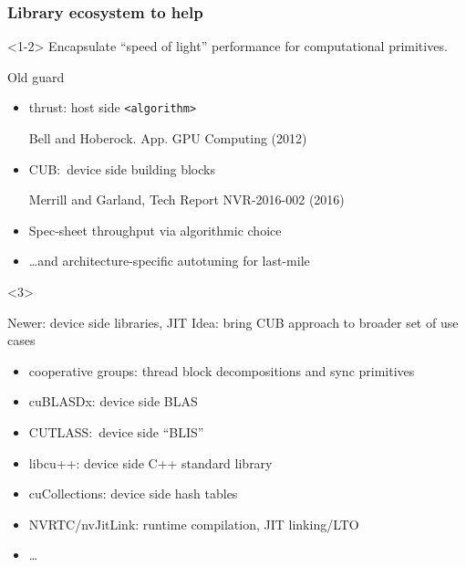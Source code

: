 \documentclass[aspectratio=169]{beamer}
\begin{document}
\begin{frame}[fragile]
  \frametitle{Library ecosystem to help}
  \begin{onlyenv}<1-2>
    Encapsulate ``speed of light'' performance for computational
    primitives. 
    \pause

    \begin{block}{Old guard}
      \begin{itemize}
      \item thrust: host side \verb~<algorithm>~

        {\scriptsize
          \raggedleft
          Bell and Hoberock. App. GPU Computing (2012) \nocite{Bell:2012}
          \par
        }
      \item CUB:~device side building blocks

        {\scriptsize
          \raggedleft
          Merrill and Garland, Tech Report NVR-2016-002 (2016) \nocite{Merrill:2016}
          \par
        }
      \item Spec-sheet throughput via algorithmic choice
      \item \dots and architecture-specific autotuning for last-mile
      \end{itemize}
    \end{block}
  \end{onlyenv}
  
  \begin{onlyenv}<3>
    \begin{block}{Newer: device side libraries, JIT}
      Idea: bring CUB approach to broader set of use cases
      \begin{itemize}
      \item \alert{cooperative groups}: thread block decompositions and sync
        primitives
      \item \alert{cuBLASDx}: device side BLAS
      \item CUTLASS:~device side ``BLIS''
      \item libcu++: device side C++ standard library
      \item cuCollections: device side hash tables
      \item NVRTC/nvJitLink: runtime compilation, JIT linking/LTO
      \item \dots
      \end{itemize}
    \end{block}
  \end{onlyenv}
\end{frame}
\end{document}
